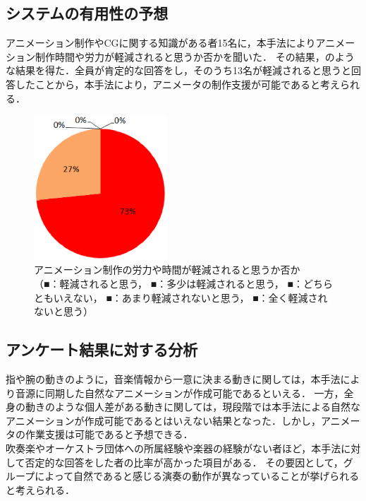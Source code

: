 \subsection{システムの有用性の予想}
アニメーション制作やCGに関する知識がある者15名に，本手法によりアニメーション制作時間や労力が軽減されると思うか否かを聞いた．
その結果，のような結果を得た．全員が肯定的な回答をし，そのうち13名が軽減されると思うと回答したことから，本手法により，アニメータの制作支援が可能であると考えられる．
\begin{figure}[!h]
	\centering
	\includegraphics[width=5cm]{fig/chap4/ans2.eps}
	\caption{アニメーション制作の労力や時間が軽減されると思うか否か\\
		（{\color{legend1}■}：軽減されると思う，
		{\color{legend2}■}：多少は軽減されると思う，
		{\color{legend3}■}：どちらともいえない，
		{\color{legend4}■}：あまり軽減されないと思う，
		{\color{legend5}■}：全く軽減されないと思う）}
	\label{fig:ans2}
\end{figure}
\newpage
\subsection{アンケート結果に対する分析}
指や腕の動きのように，音楽情報から一意に決まる動きに関しては，本手法により音源に同期した自然なアニメーションが作成可能であるといえる．
一方，全身の動きのような個人差がある動きに関しては，現段階では本手法による自然なアニメーションが作成可能であるとはいえない結果となった．しかし，アニメータの作業支援は可能であると予想できる．\\
\indent
吹奏楽やオーケストラ団体への所属経験や楽器の経験がない者ほど，本手法に対して否定的な回答をした者の比率が高かった項目がある．
その要因として，グループによって自然であると感じる演奏の動作が異なっていることが挙げられると考えられる．